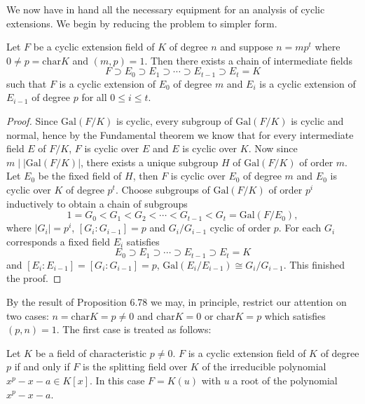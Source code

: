 We now have in hand all the necessary equipment for an analysis of cyclic extensions. We begin by reducing the problem to simpler form.
\begin{proposition}
Let $F$ be a cyclic extension field of $K$ of degree $n$ and suppose $n=mp^t$ where $0\ne p=\mathrm{char}K$ and $(m,p)=1$. Then there exists a chain of intermediate fields 
$$
F\supset E_0\supset E_1\supset \cdots \supset E_{t-1}\supset E_t=K
$$
such that $F$ is a cyclic extension of $E_0$ of degree $m$ and $E_i$ is a cyclic extension of $E_{i-1}$ of degree $p$ for all $0\le i\le t$.
\end{proposition}
\begin{proof}
Since $\mathrm{Gal}(F/K)$ is cyclic, every subgroup of $\mathrm{Gal}(F/K)$ is cyclic and normal, hence by the Fundamental theorem we know that for every intermediate field $E$ of $F/K$, $F$ is cyclic over $E$ and $E$ is cyclic over $K$. Now since $m\mid|\mathrm{Gal}(F/K)|$, there exists a unique subgroup $H$ of $\mathrm{Gal}(F/K)$ of order $m$. Let $E_0$ be the fixed field of $H$, then $F$ is cyclic over $E_0$ of degree $m$ and $E_0$ is cyclic over $K$ of degree $p^t$. Choose subgroups of $\mathrm{Gal}(F/K)$ of order $p^i$ inductively to obtain a chain of subgroups 
$$
1=G_0<G_1<G_2<\cdots <G_{t-1}<G_t=\mathrm{Gal}\left( F/E_0 \right) ,
$$
where $|G_i|=p^i$, $[G_i:G_{i-1}]=p$ and $G_i/G_{i-1}$ cyclic of order $p$. For each $G_i$ corresponds a fixed field $E_i$ satisfies 
$$
E_0\supset E_1\supset \cdots \supset E_{t-1}\supset E_t=K
$$
and $[E_i:E_{i-1}]=[G_i:G_{i-1}]=p$, $\mathrm{Gal}(E_i/E_{i-1})\cong G_i/G_{i-1}$. This finished the proof.
\end{proof}
By the result of Proposition 6.78 we may, in principle, restrict our attention on two cases: $n=\mathrm{char}K=p\ne 0$ and $\mathrm{char}K=0$ or $\mathrm{char}K=p$ which satisfies $(p,n)=1$. The first case is treated as follows: 
\begin{proposition}
Let $K$ be a field of characteristic $p\ne 0$. $F$ is a cyclic extension field of $K$ of degree $p$ if and only if $F$ is the splitting field over $K$ of the irreducible polynomial $x^p-x-a\in K[x]$. In this case $F=K(u)$ with $u$ a root of the polynomial $x^p-x-a$.
\end{proposition}
